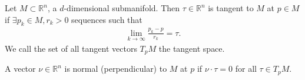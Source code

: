 \begin{definition}\label{def:tangent-normal-vector}
	Let $M \subset \mathbb{R}^{n}$, a $d$-dimensional submanifold. Then $\tau \in \mathbb{R}^{n}$ is tangent to $M$ at $p \in M$ if $\exists p_{k} \in M, r_{k} > 0$ sequences such that
	\begin{align*}
		\lim_{k \to \infty} \frac{p_{k} - p}{r_{k}} = \tau.
	\end{align*}
	We call the set of all tangent vectors $T_{p}M$ the tangent space.

	A vector $\nu \in \mathbb{R}^{n}$ is normal (perpendicular) to $M$ at $p$ if $\nu \cdot \tau = 0$ for all $\tau \in T_{p}M$.
\end{definition}

